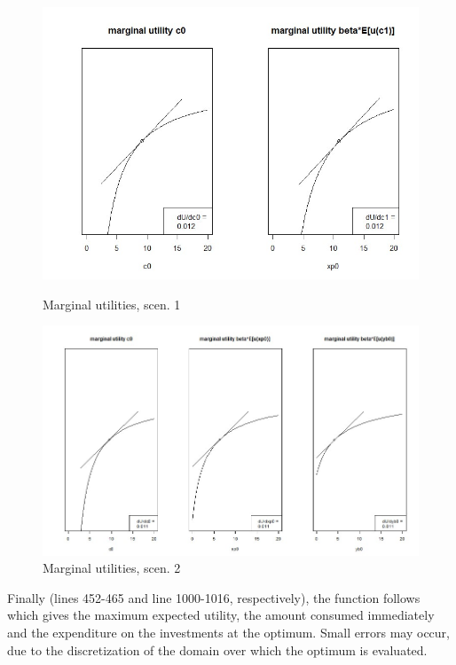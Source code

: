 \begin{figure}[h!]
  \centering
  \begin{minipage}[b]{0.47\textwidth}
    \includegraphics[width=\textwidth, trim = 0 10 0 36,clip]{files/2.3.jpg}
    \caption{Marginal utilities, scen. 1}
  \end{minipage}
  \hfill
  \begin{minipage}[b]{0.51\textwidth}
    \includegraphics[width=\textwidth, trim = 0 0 0 32,clip]{files/3.3.jpg}
    \caption{Marginal utilities, scen. 2}
  \end{minipage}
\end{figure}

\bigskip

\noindent Finally (lines 452-465 and line 1000-1016, respectively), the function follows which gives the maximum expected utility, the amount consumed immediately and the expenditure on the investments at the optimum.
Small errors may occur, due to the discretization of the domain over which the optimum is evaluated.
